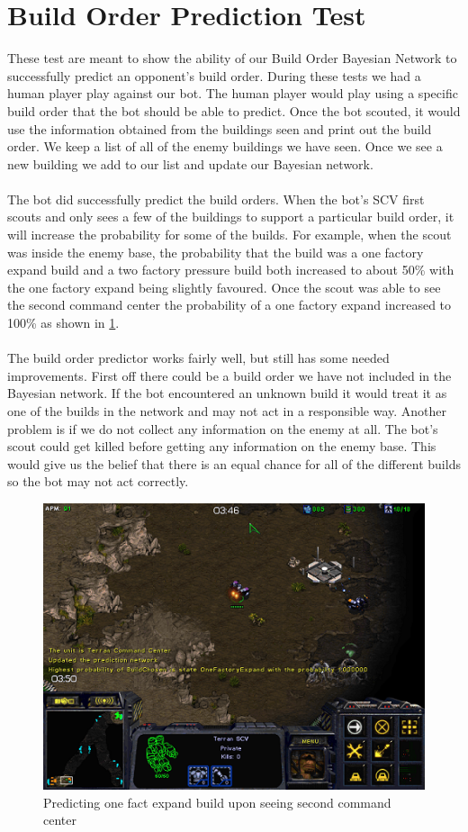 \section{Build Order Prediction Test}
These test are meant to show the ability of our Build Order Bayesian Network to successfully predict an opponent's build order.
During these tests we had a human player play against our bot. The human player would play using a specific build order that the bot should be able to predict. Once the bot scouted, it would use the information obtained from the buildings seen and print out the build order. We keep a list of all of the enemy buildings we have seen. Once we see a new building we add to our list and update our Bayesian network.\\
\\
The bot did successfully predict the build orders. When the bot's SCV first scouts and only sees a few of the buildings to support a particular build order, it will increase the probability for some of the builds. For example, when the scout was inside the enemy base, the probability that the build was a one factory expand build and a two factory pressure build both increased to about 50\% with the one factory expand being slightly favoured. Once the scout was able to see the second command center the probability of a one factory expand increased to 100\% as shown in \ref{fig:predicting}. 
\\
\\
The build order predictor works fairly well, but still has some needed improvements. First off there could be a build order we have not included in the Bayesian network. If the bot encountered an unknown build it would treat it as one of the builds in the network and may not act in a responsible way. Another problem is if we do not collect any information on the enemy at all. The bot's scout could get killed before getting any information on the enemy base. This would give us the belief that there is an equal chance for all of the different builds so the bot may not act correctly.

	\begin{figure}[H]
		\includegraphics[scale=0.7]{Figures/BuildOrderPredictorTest/Predicting.png}
		\caption{Predicting one fact expand build upon seeing second command center}\label{fig:predicting}
	\end{figure}
